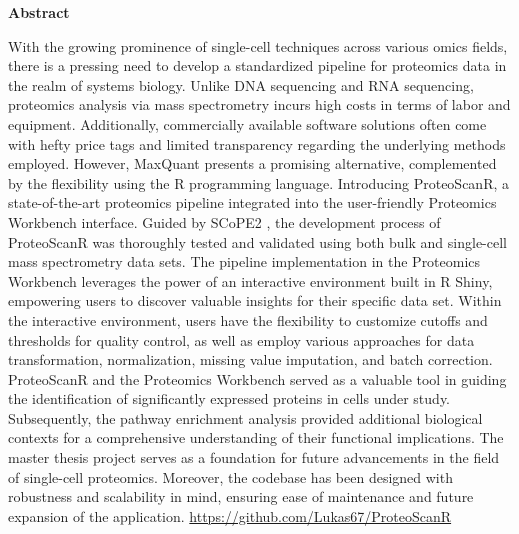 \documentclass[
  11pt,
]{article}
\begin{document}
\newpage


\begin{centering}

{\bf Abstract}

\end{centering}


With the growing prominence of single-cell techniques across various omics fields, there is a pressing need to develop a standardized pipeline for proteomics data in the realm of systems biology. Unlike DNA sequencing and RNA sequencing, proteomics analysis via mass spectrometry incurs high costs in terms of labor and equipment. Additionally, commercially available software solutions often come with hefty price tags and limited transparency regarding the underlying methods employed. However, MaxQuant \citep{Cox2008} presents a promising alternative, complemented by the flexibility using the R programming language.
Introducing ProteoScanR, a state-of-the-art proteomics pipeline integrated into the user-friendly Proteomics Workbench interface.
Guided by SCoPE2 \citep{Specht2021, Petelski2021, Vanderaa2021}, the development process of ProteoScanR was thoroughly tested and validated using both bulk and single-cell mass spectrometry data sets. The pipeline implementation in the Proteomics Workbench leverages the power of an interactive environment built in R Shiny, empowering users to discover valuable insights for their specific data set.
Within the interactive environment, users have the flexibility to customize cutoffs and thresholds for quality control, as well as employ various approaches for data transformation, normalization, missing value imputation, and batch correction.
ProteoScanR and the Proteomics Workbench served as a valuable tool in guiding the identification of significantly expressed proteins in cells under study. Subsequently, the pathway enrichment analysis provided additional biological contexts for a comprehensive understanding of their functional implications.
The master thesis project serves as a foundation for future advancements in the field of single-cell proteomics. Moreover, the codebase has been designed with robustness and scalability in mind, ensuring ease of maintenance and future expansion of the application.
\url{https://github.com/Lukas67/ProteoScanR}


\newpage

\centering
\raggedright
\newpage
\tableofcontents
\end{document}
